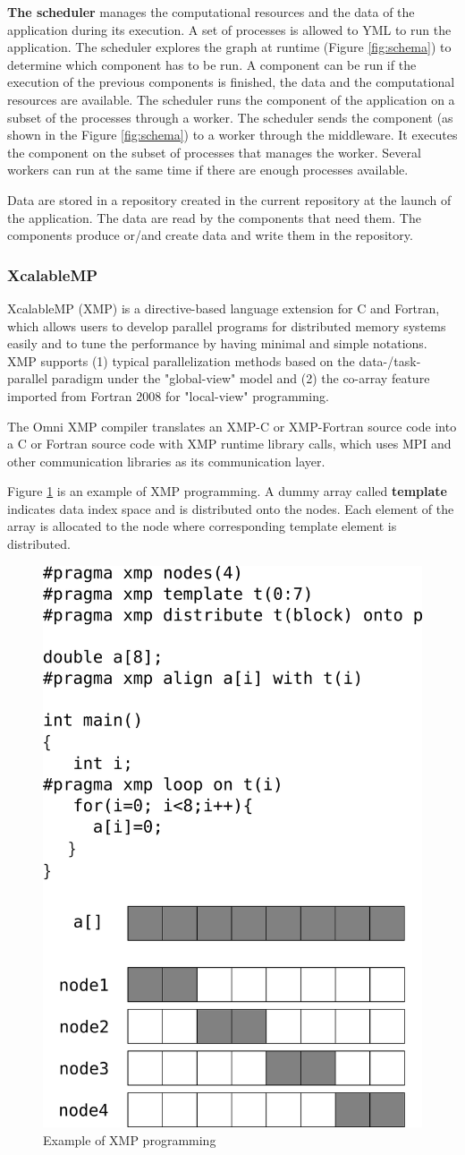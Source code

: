\textbf{The scheduler} manages the computational resources and the data of the application during its execution.
A set of processes is allowed to YML to run the application.
The scheduler explores the graph at runtime (Figure \ref{fig:schema}) to determine which component has to be run.
A component can be run if the execution of the previous components is finished, the data and the computational resources are available.
The scheduler runs the component of the application on a subset of the processes through a worker.
The scheduler sends the component (as shown in the Figure \ref{fig:schema}) to a worker through the middleware.
It executes the component on the subset of processes that manages the worker.
Several workers can run at the same time if there are enough processes available.

Data are stored in a repository created in the current repository at the launch of the application.
The data are read by the components that need them.
The components produce or/and create data and write them in the repository.

\subsubsection{XcalableMP}
XcalableMP (XMP) \cite{XMP} is a directive-based language extension for C and Fortran,  which allows users to develop parallel programs for distributed memory systems easily and to tune the performance by having minimal and simple notations.
XMP supports (1) typical parallelization methods based on the data-/task-parallel paradigm under the "global-view" model and (2) the co-array feature imported from Fortran 2008 for "local-view" programming.

The Omni XMP compiler translates an XMP-C or XMP-Fortran source code into a C or Fortran source code with XMP runtime library calls, which uses MPI and other communication libraries as its communication layer.

Figure \ref{fig:xmpprog} is an example of XMP programming.
A dummy array called {\bf template} indicates data index space and is distributed onto the nodes.
Each element of the array is allocated to the node where corresponding template element is distributed.

\begin{figure}
	\centering
	\includegraphics[width=.35\textwidth]{xmp-example.pdf}
	\caption{Example of XMP programming\label{fig:xmpprog}}
\end{figure}

